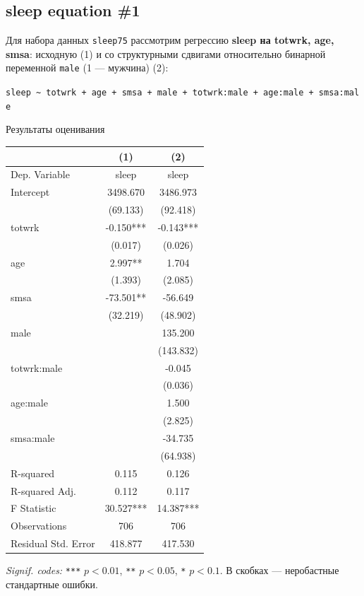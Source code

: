 \documentclass[
  russian,
]{article}
\newcounter{none} %
\begin{document}
\subsection{sleep equation \#1}\label{sleep-equation-1}

Для набора данных \texttt{sleep75} рассмотрим регрессию \textbf{sleep на
totwrk, age, smsa}: исходную (1) и со структурными сдвигами относительно
бинарной переменной \texttt{male} (1 --- мужчина) (2):

\texttt{sleep\ \textasciitilde{}\ totwrk\ +\ age\ +\ smsa\ +\ male\ +\ totwrk:male\ +\ age:male\ +\ smsa:male}

Результаты оценивания

{\def\LTcaptype{none} %
\begin{longtable}[]{@{}lcc@{}}
\toprule\noalign{}
& (1) & (2) \\
\midrule\noalign{}
\endhead
\bottomrule\noalign{}
\endlastfoot
Dep. Variable & sleep & sleep \\
Intercept & 3498.670 & 3486.973 \\
& (69.133) & (92.418) \\
totwrk & -0.150*** & -0.143*** \\
& (0.017) & (0.026) \\
age & 2.997** & 1.704 \\
& (1.393) & (2.085) \\
smsa & -73.501** & -56.649 \\
& (32.219) & (48.902) \\
male & & 135.200 \\
& & (143.832) \\
totwrk:male & & -0.045 \\
& & (0.036) \\
age:male & & 1.500 \\
& & (2.825) \\
smsa:male & & -34.735 \\
& & (64.938) \\
R-squared & 0.115 & 0.126 \\
R-squared Adj. & 0.112 & 0.117 \\
F Statistic & 30.527*** & 14.387*** \\
Observations & 706 & 706 \\
Residual Std. Error & 418.877 & 417.530 \\
\end{longtable}
}

\emph{Signif. codes:} \texttt{***} \(p<0.01\), \texttt{**} \(p<0.05\),
\texttt{*} \(p<0.1\). В скобках --- неробастные стандартные ошибки.
\end{document}
